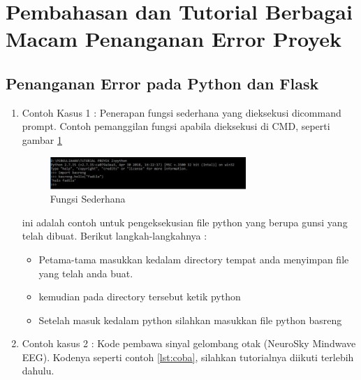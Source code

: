 \section{Pembahasan dan Tutorial Berbagai Macam Penanganan Error Proyek}

\subsection{Penanganan Error pada Python dan Flask}
\begin{enumerate}
  \item Contoh Kasus 1 : Penerapan fungsi sederhana yang dieksekusi dicommand prompt. Contoh pemanggilan fungsi apabila dieksekusi di CMD, seperti gambar \ref{fig:contohsederhana}

  \begin{figure}[!ht]
        \centerline{\includegraphics[width=0.70\textwidth]{figures/10/contohsederhana.jpg}}
	    \caption{Fungsi Sederhana}
	    \label{fig:contohsederhana}
  \end{figure}


ini adalah contoh untuk pengeksekusian file python yang berupa gunsi yang telah dibuat. Berikut langkah-langkahnya :
    \begin{itemize}
        \item Petama-tama masukkan kedalam directory tempat anda menyimpan file yang telah anda buat.
        \item kemudian pada directory tersebut ketik python
        \item Setelah masuk kedalam python silahkan masukkan file python basreng
    \end{itemize}

  \item Contoh kasus 2 : Kode pembawa sinyal gelombang otak (NeuroSky Mindwave EEG). Kodenya seperti contoh \ref{lst:coba}, silahkan tutorialnya diikuti terlebih dahulu.

\end{enumerate}

